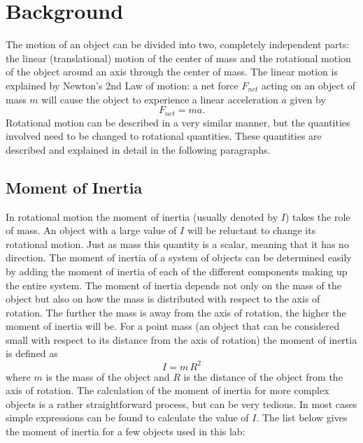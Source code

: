 
\label{lab:M7_1171L}

\section{Background}

The motion of an object can be divided into two, completely independent parts: the linear (translational) motion of the center of mass and the rotational motion of the object around an axis through the center of mass. The linear motion is explained by Newton's 2nd Law of motion: a net force $F_{net}$ acting on an object of mass $m$ will cause the object to experience a linear acceleration $a$ given by
\[
F_{net} = m a.
\]
Rotational motion can be described in a very similar manner, but the quantities involved need to be changed to rotational quantities. These quantities are described and explained in detail in the following paragraphs.



\subsection{Moment of Inertia}

In rotational motion the moment of inertia (usually denoted by $I$) takes the role of mass. An object with a large value of $I$ will be reluctant to change its rotational motion. Just as mass this quantity is a scalar, meaning that it has no direction. The moment of inertia of a system of objects can be determined easily by adding the moment of inertia of each of the different components making up the entire system. The moment of inertia depends not only on the mass of the object but also on how the mass is distributed with respect to the axis of rotation. The further the mass is away from the axis of rotation, the higher the moment of inertia will be. For a point mass (an object that can be considered small with respect to its distance from the axis of rotation) the moment of inertia is defined as
\begin{equation}
  \label{eq:M08pointMass}
  I = m\, R^{2}
\end{equation}
where $m$ is the mass of the object and $R$ is the distance of the object from the axis of rotation.
The calculation of the moment of inertia for more complex objects is a rather straightforward process, but can be very tedious. In most cases simple expressions can be found to calculate the value of $I$. The list below gives the moment of inertia for a few objects used in this lab:

